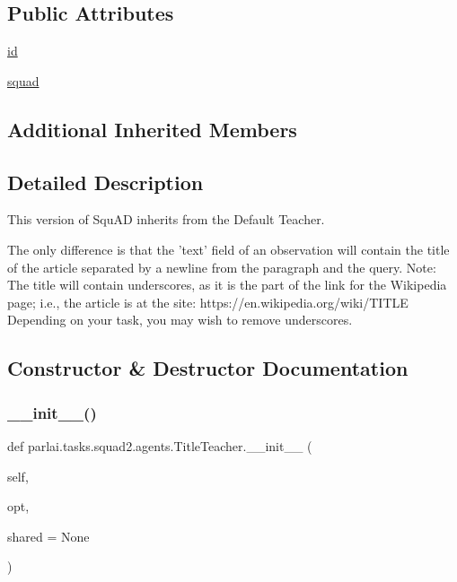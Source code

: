 \subsection*{Public Attributes}
\begin{DoxyCompactItemize}
\item 
\hyperlink{classparlai_1_1tasks_1_1squad2_1_1agents_1_1TitleTeacher_a7c29404ea09cd71791d48377d35d8e6d}{id}
\item 
\hyperlink{classparlai_1_1tasks_1_1squad2_1_1agents_1_1TitleTeacher_a192c7e24f0159dcb8c512526e7f8a1fb}{squad}
\end{DoxyCompactItemize}
\subsection*{Additional Inherited Members}


\subsection{Detailed Description}
\begin{DoxyVerb}This version of SquAD inherits from the Default Teacher.

The only
difference is that the 'text' field of an observation will contain
the title of the article separated by a newline from the paragraph and the
query.
Note: The title will contain underscores, as it is the part of the link for
the Wikipedia page; i.e., the article is at the site:
https://en.wikipedia.org/wiki/{TITLE}
Depending on your task, you may wish to remove underscores.
\end{DoxyVerb}
 

\subsection{Constructor \& Destructor Documentation}
\mbox{\label{classparlai_1_1tasks_1_1squad2_1_1agents_1_1TitleTeacher_ad0306665ca749e4b3bb3835d81e3e26b}} 
\subsubsection{\texorpdfstring{\+\_\+\+\_\+init\+\_\+\+\_\+()}{\_\_init\_\_()}}
{\footnotesize\ttfamily def parlai.\+tasks.\+squad2.\+agents.\+Title\+Teacher.\+\_\+\+\_\+init\+\_\+\+\_\+ (\begin{DoxyParamCaption}\item[{}]{self,  }\item[{}]{opt,  }\item[{}]{shared = {\ttfamily None} }\end{DoxyParamCaption})}



